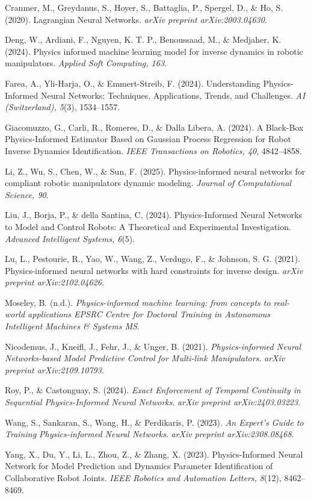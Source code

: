 \begin{thebibliography}{99}

Cranmer, M., Greydanus, S., Hoyer, S., Battaglia, P., Spergel, D., \& Ho, S. (2020). Lagrangian Neural Networks. \textit{arXiv preprint arXiv:2003.04630}.

Deng, W., Ardiani, F., Nguyen, K. T. P., Benoussaad, M., \& Medjaher, K. (2024). Physics informed machine learning model for inverse dynamics in robotic manipulators. \textit{Applied Soft Computing, 163}.

Farea, A., Yli-Harja, O., \& Emmert-Streib, F. (2024). Understanding Physics-Informed Neural Networks: Techniques, Applications, Trends, and Challenges. \textit{AI (Switzerland), 5}(3), 1534–1557.

Giacomuzzo, G., Carli, R., Romeres, D., \& Dalla Libera, A. (2024). A Black-Box Physics-Informed Estimator Based on Gaussian Process Regression for Robot Inverse Dynamics Identification. \textit{IEEE Transactions on Robotics, 40}, 4842–4858.

Li, Z., Wu, S., Chen, W., \& Sun, F. (2025). Physics-informed neural networks for compliant robotic manipulators dynamic modeling. \textit{Journal of Computational Science, 90}.

Liu, J., Borja, P., \& della Santina, C. (2024). Physics-Informed Neural Networks to Model and Control Robots: A Theoretical and Experimental Investigation. \textit{Advanced Intelligent Systems, 6}(5).

Lu, L., Pestourie, R., Yao, W., Wang, Z., Verdugo, F., \& Johnson, S. G. (2021). Physics-informed neural networks with hard constraints for inverse design. \textit{arXiv preprint arXiv:2102.04626}.

Moseley, B. (n.d.). \textit{Physics-informed machine learning: from concepts to real-world applications EPSRC Centre for Doctoral Training in Autonomous Intelligent Machines \& Systems MS}.

Nicodemus, J., Kneifl, J., Fehr, J., \& Unger, B. (2021). \textit{Physics-informed Neural Networks-based Model Predictive Control for Multi-link Manipulators}. \textit{arXiv preprint arXiv:2109.10793}.

Roy, P., \& Castonguay, S. (2024). \textit{Exact Enforcement of Temporal Continuity in Sequential Physics-Informed Neural Networks}. \textit{arXiv preprint arXiv:2403.03223}.

Wang, S., Sankaran, S., Wang, H., \& Perdikaris, P. (2023). \textit{An Expert’s Guide to Training Physics-informed Neural Networks}. \textit{arXiv preprint arXiv:2308.08468}.

Yang, X., Du, Y., Li, L., Zhou, Z., \& Zhang, X. (2023). Physics-Informed Neural Network for Model Prediction and Dynamics Parameter Identification of Collaborative Robot Joints. \textit{IEEE Robotics and Automation Letters, 8}(12), 8462–8469.

\end{thebibliography} 